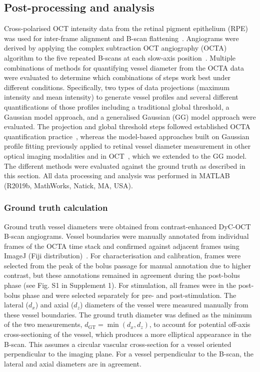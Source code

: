 \documentclass{optica-article}
\begin{document}
\subsection{Post-processing and analysis}
\label{subsec:postproc_dia}
Cross-polarised OCT intensity data from the retinal pigment epithelium (RPE) was used for inter-frame alignment and B-scan flattening~\cite{augustinMultifunctionalOCTImage2016,merkleHighresolutionDepthresolvedVascular2021}. Angiograms were derived by applying the complex subtraction OCT angiography (OCTA) algorithm to the five repeated B-scans at each slow-axis position~\cite{srinivasanRapidVolumetricAngiography2010}. Multiple combinations of methods for quantifying vessel diameter from the OCTA data were evaluated to determine which combinations of steps work best under different conditions. Specifically, two types of data projections (maximum intensity and mean intensity) to generate vessel profiles and several different quantifications of those profiles including a traditional global threshold, a Gaussian model approach, and a generalised Gaussian (GG) model approach were evaluated. The projection and global threshold steps followed established OCTA quantification practice~\cite{untrachtTowardsStandardisingRetinal2024,hormelMaximumValueProjection2018,sampsonTowardsStandardizingRetinal2022}, whereas the model-based approaches built on Gaussian profile fitting previously applied to retinal vessel diameter measurement in other optical imaging modalities and in OCT~\cite{zhouDetectionQuantificationRetinopathy1994,lowellMeasurementRetinalVessel2004,leahyMapping3DConnectivity2015}, which we extended to the GG model. The different methods were evaluated against the ground truth as described in this section. All data processing and analysis was performed in MATLAB (R2019b, MathWorks, Natick, MA, USA).

\subsubsection{Ground truth calculation}
\label{subsubsec:ground_truth}
Ground truth vessel diameters were obtained from contrast-enhanced DyC-OCT B-scan angiograms. Vessel boundaries were manually annotated from individual frames of the OCTA time stack and confirmed against adjacent frames using ImageJ (Fiji distribution)~\cite{schindelinFijiOpensourcePlatform2012}. For characterisation and calibration, frames were selected from the peak of the bolus passage for manual annotation due to higher contrast, but these annotations remained in agreement during the post-bolus phase (see Fig. S1 in Supplement 1). For stimulation, all frames were in the post-bolus phase and were selected separately for pre- and post-stimulation. The lateral ($d_x$) and axial ($d_z$) diameters of the vessel were measured manually from these vessel boundaries. The ground truth diameter was defined as the minimum of the two measurements, $d_{\mathrm{GT}} = \min(d_x, d_z)$, to account for potential off-axis cross-sectioning of the vessel, which produces a more elliptical appearance in the B-scan. This assumes a circular vascular cross-section for a vessel oriented perpendicular to the imaging plane. For a vessel perpendicular to the B-scan, the lateral and axial diameters are in agreement.
\end{document}
